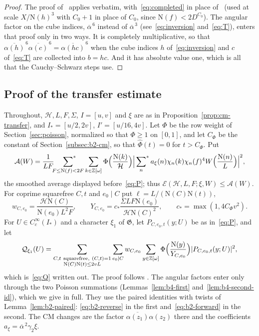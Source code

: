 \documentclass[11pt]{article}
\numberwithin{equation}{section}
\newcommand{\OO}{\mathbb Z[\omega]}
\newcommand{\N}{\mathrm N}
\newcommand{\E}{\mathcal E}
\newcommand{\ssum}{\sideset{}{^*}\sum}
\begin{document}
\begin{proof}
The proof of~\cite[Lemma~5.3]{OAI1112} applies verbatim, with~\eqref{eq:completed} in place
of~\cite[Proposition~5.2]{OAI1112} (used at scale $X/\N(h)^3$ with $C_0+1$ in place of $C_0$,
since $\N(f)<2D^{C_0}$). The angular factor on the cube indices, $\overline\alpha^{\,6}$ instead of
$\overline\alpha^{\,3}$ (see~\eqref{eq:inversion} and~\eqref{eq:T}), enters that proof only in two
ways. It is completely multiplicative, so that
$\overline{\alpha(h)}^{\,6}\overline{\alpha(c)}^{\,6}=\overline{\alpha(hc)}^{\,6}$ when the cube
indices $h$ of~\eqref{eq:inversion} and $c$ of~\eqref{eq:T} are collected into $b=hc$. And it has
absolute value one, which is all that the Cauchy--Schwarz steps use.
\end{proof}

\subsection{Proof of the transfer estimate}\label{subsec:b4-transfer}

Throughout, $\mathcal H,L,F,\Sigma$, $I=[u,v]$ and $\xi$ are as in Proposition~\ref{prop:cm-transfer},
and $I_*=[u/2,2v]$, $I'=[u/16,4v]$. Let $\Phi$ be the row weight of Section~\ref{sec:poisson},
normalized so that $\Phi\ge1$ on $[0,1]$, and let $C_\Phi$ be the constant of
Section~\ref{subsec:b2-cm}, so that $\widehat\Phi(t)=0$ for $t>C_\Phi$. Put
\begin{equation}\label{eq:b4-A}
 \mathcal A(W)=\frac1{LF}\ssum_{F\le\N(f)<2F}\sum_{k\in\OO}\Phi\Bigl(\frac{\N(k)}{\mathcal H}\Bigr)
 \Bigl|\ssum_na_\xi(n)\chi_n(k)\chi_n(f)^4W\Bigl(\frac{\N(n)}L\Bigr)\Bigr|^2,
\end{equation}
the smoothed average displayed before~\eqref{eq:P}; thus $\E(\mathcal H,L,F;\xi,W)\le\mathcal A(W)$.
For coprime squarefree $C,t$ and $e_0\mid C$ put $\ell=L/(\N(C)\N(t))$,
\begin{equation}\label{eq:d062}
 w_{C,e_0}=\frac{\mathcal H\N(C)}{\N(e_0)L^2F},\qquad
 Y_{C,e_0}=c_*\frac{\Sigma LF\N(e_0)}{\mathcal H\N(C)^2},\qquad c_*=\max(1,4C_\Phi v^2).
\end{equation}
For $U\in C_c^\infty(I_*)$ and a character $\xi_1$ of $\mathfrak G$, let $P_{C,e_0,t}(y;U)$ be as
in~\eqref{eq:P}, and let
\begin{equation}\label{eq:b4-Q}
 \mathcal Q_{\xi_1}(U)=\sum_{\substack{C,t\ \mathrm{squarefree},\ (C,t)=1\\\N(C)\N(t)\le2vL}}
 \sum_{e_0\mid C}w_{C,e_0}\sum_{y\in\OO}\Phi\Bigl(\frac{\N(y)}{Y_{C,e_0}}\Bigr)|P_{C,e_0,t}(y;U)|^2,
\end{equation}
which is~\eqref{eq:Q} written out. The proof follows \cite[Section~7]{OAI1112}. The angular factors
enter only through the two Poisson summations (Lemmas~\ref{lem:b4-first}
and~\ref{lem:b4-second-id}), which we give in full. They use the paired identities with twists of
Lemma~\ref{lem:b2-paired}: \eqref{eq:b2-reverse} in the first and~\eqref{eq:b2-forward} in the
second. The CM changes are the factor $\overline{\alpha(z_1)}\alpha(z_2)$ there and the
coefficients $a_\xi=\overline\alpha^{\,2}\gamma_2\xi$.
\end{document}
